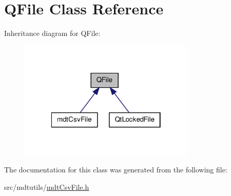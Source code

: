 \hypertarget{class_q_file}{\section{Q\-File Class Reference}
\label{class_q_file}
}


Inheritance diagram for Q\-File\-:
\nopagebreak
\begin{figure}[H]
\begin{center}
\leavevmode
\includegraphics[width=238pt]{class_q_file__inherit__graph}
\end{center}
\end{figure}


The documentation for this class was generated from the following file\-:\begin{DoxyCompactItemize}
\item 
src/mdtutils/\hyperlink{mdt_csv_file_8h}{mdt\-Csv\-File.\-h}\end{DoxyCompactItemize}
